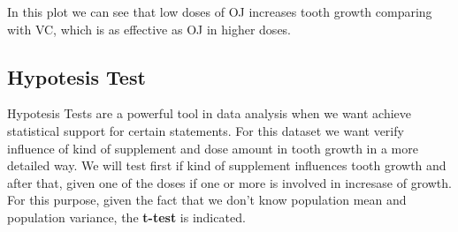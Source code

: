 \documentclass[a4paper, 12pt]{article}\usepackage[]{graphicx}\usepackage[]{color}
\begin{document}
In this plot we can see that low doses of OJ increases tooth growth comparing with VC, which is as effective as OJ in higher doses.

        \subsection{Hypotesis Test}
        Hypotesis Tests are a powerful tool in data analysis when we want achieve statistical support for certain statements.  For this dataset we want verify influence of kind of supplement and dose amount in tooth growth in a more detailed way.  We will test first if kind of supplement influences tooth growth and after that, given one of the doses if one or more is involved in incresase of growth.\\
        
        For this purpose, given the fact that we don't know population mean and population variance, the \textbf{t-test} is indicated.
\end{document}

